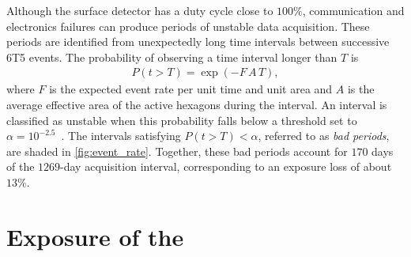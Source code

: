 \documentclass[main.tex]{subfiles}
\begin{document}
Although the surface detector has a duty cycle close to $100\%$, communication and electronics failures can produce periods of unstable data acquisition.
These periods are identified from unexpectedly long time intervals between successive 6T5 events.
The probability of observing a time interval longer than $T$ is
\begin{align}
    P(t>T)=\exp(-F\,A \,T),
\end{align}
where $F$ is the expected event rate per unit time and unit area and $A$ is the average effective area of the active hexagons during the interval.
An interval is classified as unstable when this probability falls below a threshold set to $\alpha=10^{-2.5}$~\cite{GAP:Gonzalez:2022:Exposure}.
The intervals satisfying $P(t>T)<\alpha$, referred to as \textit{bad periods}, are shaded in \cref{fig:event_rate}.
Together, these bad periods account for $170$ days of the $1269$-day acquisition interval, corresponding to an exposure loss of about $13\%$.


\section{Exposure of the }
\label{sec:exposure}
\end{document}
